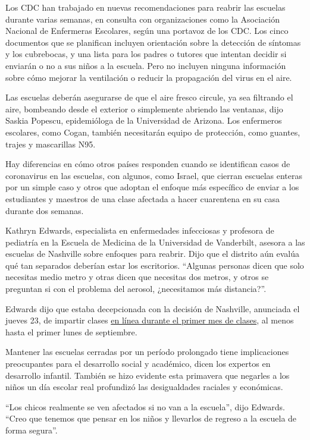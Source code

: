Los CDC han trabajado en nuevas recomendaciones para reabrir las
escuelas durante varias semanas, en consulta con organizaciones como la
Asociación Nacional de Enfermeras Escolares, según una portavoz de los
CDC. Los cinco documentos que se planifican incluyen orientación sobre
la detección de síntomas y los cubrebocas, y una lista para los padres o
tutores que intentan decidir si enviarán o no a sus niños a la escuela.
Pero no incluyen ninguna información sobre cómo mejorar la ventilación o
reducir la propagación del virus en el aire.

Las escuelas deberán asegurarse de que el aire fresco circule, ya sea
filtrando el aire, bombeando desde el exterior o simplemente abriendo
las ventanas, dijo Saskia Popescu, epidemióloga de la Universidad de
Arizona. Los enfermeros escolares, como Cogan, también necesitarán
equipo de protección, como guantes, trajes y mascarillas N95.

Hay diferencias en cómo otros países responden cuando se identifican
casos de coronavirus en las escuelas, con algunos, como Israel, que
cierran escuelas enteras por un simple caso y otros que adoptan el
enfoque más específico de enviar a los estudiantes y maestros de una
clase afectada a hacer cuarentena en su casa durante dos semanas.

Kathryn Edwards, especialista en enfermedades infecciosas y profesora de
pediatría en la Escuela de Medicina de la Universidad de Vanderbilt,
asesora a las escuelas de Nashville sobre enfoques para reabrir. Dijo
que el distrito aún evalúa qué tan separados deberían estar los
escritorios. ``Algunas personas dicen que solo necesitas medio metro y
otras dicen que necesitas dos metros, y otros se preguntan si con el
problema del aerosol, ¿necesitamos más distancia?''.

Edwards dijo que estaba decepcionada con la decisión de Nashville,
anunciada el jueves 23, de impartir clases
\href{https://www.tennessean.com/story/news/education/2020/07/09/metro-schools-academic-year-start-online-nashville-students/5383315002/}{en
línea durante el primer mes de clases}, al menos hasta el primer lunes
de septiembre.

Mantener las escuelas cerradas por un período prolongado tiene
implicaciones preocupantes para el desarrollo social y académico, dicen
los expertos en desarrollo infantil. También se hizo evidente esta
primavera que negarles a los niños un día escolar real profundizó las
desigualdades raciales y económicas.

``Los chicos realmente se ven afectados si no van a la escuela'', dijo
Edwards. ``Creo que tenemos que pensar en los niños y llevarlos de
regreso a la escuela de forma segura''.

